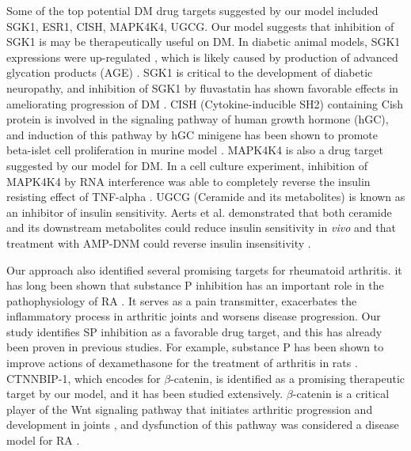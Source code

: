     Some of the top potential DM drug targets  suggested by our model  included SGK1, ESR1, CISH, MAPK4K4, UGCG. Our model suggests that inhibition of  SGK1 is may be therapeutically useful on DM. In diabetic animal models, SGK1 expressions were up-regulated \cite{hills2006high, xuebin2005expression,chang2007enhancement}, which is likely caused by production of advanced glycation products (AGE) \cite{hills2006high,chang2007enhancement}. SGK1 is critical to the development of diabetic neuropathy, and inhibition of SGK1 by fluvastatin has shown favorable effects in ameliorating progression of DM \cite{xuebin2005expression}.  CISH (Cytokine-inducible SH2) containing Cish protein is involved in the signaling pathway of  human growth hormone (hGC), and induction of this pathway by hGC minigene has been shown to promote beta-islet cell proliferation in murine model \cite{baan2015transgenic}. MAPK4K4 is also a drug target suggested by our model for DM. In a cell culture experiment, inhibition of MAPK4K4 by RNA interference was able to completely reverse the insulin resisting effect of TNF-alpha \cite{bouzakri2007map4k4}. UGCG (Ceramide and its metabolites) is known as an inhibitor of insulin sensitivity. Aerts et al. demonstrated that both ceramide and its downstream metabolites could reduce insulin sensitivity in\textit{ vivo} and that treatment with AMP-DNM could reverse insulin insensitivity \cite{aerts2007pharmacological}. 

    Our approach also identified several promising targets for rheumatoid arthritis. it has long been shown that substance P inhibition has an important role in the pathophysiology of RA \cite{lisowska2015substance,garrett1992role,green2005gastrin,keeble2004role,lotz1987substance,okamura2017dual,lam1990mediators,lam1991neurogenic}. It serves as a pain transmitter, exacerbates the inflammatory process in arthritic joints and worsens disease progression. Our study identifies SP inhibition as a favorable drug target, and this has already been proven in previous studies. For example, substance P has been shown to improve actions of dexamethasone for the treatment of arthritis in rats \cite{lam2010substance}. CTNNBIP-1, which encodes for $\beta$-catenin, is identified as a promising therapeutic target by our model, and it has been studied extensively. $\beta$-catenin is a critical player of the Wnt signaling pathway that initiates arthritic progression and development in joints \cite{sen2005wnt,zhou2017wnt}, and dysfunction of this pathway was considered a disease model for RA \cite{wu2010beta,zhou2017wnt}. 
    
